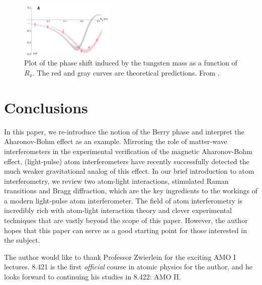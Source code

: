 \documentclass[reprint,
nofootinbib,
amsmath,amssymb,
aps]{revtex4-1}
\begin{document}
\begin{figure}
	\includegraphics[width=0.4\textwidth]{52hbark_edited.png}
	\caption{Plot of the phase shift induced by the tungsten mass as a function of $R_x$. The red and gray curves are theoretical predictions. From \cite{overstreet2022observation}.}
	\label{fig:data}
\end{figure}







\section{Conclusions}


In this paper, we re-introduce the notion of the Berry phase and interpret the Aharonov-Bohm effect as an example. Mirroring the role of matter-wave interferometers in the experimental verification of the magnetic Aharonov-Bohm effect, (light-pulse) atom interferometers have recently successfully detected the much weaker gravitational analog of this effect. In our brief introduction to atom interferometry, we review two atom-light interactions, stimulated Raman transitions and Bragg diffraction, which are the key ingredients to the workings of a modern light-pulse atom interferometer. The field of atom interferometry is incredibly rich with atom-light interaction theory and clever experimental techniques that are vastly beyond the scope of this paper. However, the author hopes that this paper can serve as a good starting point for those interested in the subject. 



\begin{acknowledgments}
	The author would like to thank Professor Zwierlein for the exciting AMO I lectures. 8.421 is the first \textit{official} course in atomic physics for the author, and he looks forward to continuing his studies in 8.422: AMO II. 
\end{acknowledgments}



\end{document}
